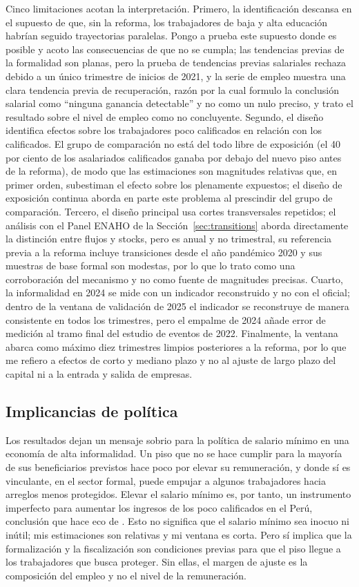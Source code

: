Cinco limitaciones acotan la interpretación. Primero, la identificación descansa en el supuesto de que, sin la reforma, los trabajadores de baja y alta educación habrían seguido trayectorias paralelas. Pongo a prueba este supuesto donde es posible y acoto las consecuencias de que no se cumpla; las tendencias previas de la formalidad son planas, pero la prueba de tendencias previas salariales rechaza debido a un único trimestre de inicios de 2021, y la serie de empleo muestra una clara tendencia previa de recuperación, razón por la cual formulo la conclusión salarial como ``ninguna ganancia detectable'' y no como un nulo preciso, y trato el resultado sobre el nivel de empleo como no concluyente. Segundo, el diseño identifica efectos sobre los trabajadores poco calificados en relación con los calificados. El grupo de comparación no está del todo libre de exposición (el 40 por ciento de los asalariados calificados ganaba por debajo del nuevo piso antes de la reforma), de modo que las estimaciones son magnitudes relativas que, en primer orden, subestiman el efecto sobre los plenamente expuestos; el diseño de exposición continua aborda en parte este problema al prescindir del grupo de comparación. Tercero, el diseño principal usa cortes transversales repetidos; el análisis con el Panel ENAHO de la Sección~\ref{sec:transitions} aborda directamente la distinción entre flujos y stocks, pero es anual y no trimestral, su referencia previa a la reforma incluye transiciones desde el año pandémico 2020 y sus muestras de base formal son modestas, por lo que lo trato como una corroboración del mecanismo y no como fuente de magnitudes precisas. Cuarto, la informalidad en 2024 se mide con un indicador reconstruido y no con el oficial; dentro de la ventana de validación de 2025 el indicador se reconstruye de manera consistente en todos los trimestres, pero el empalme de 2024 añade error de medición al tramo final del estudio de eventos de 2022. Finalmente, la ventana abarca como máximo diez trimestres limpios posteriores a la reforma, por lo que me refiero a efectos de corto y mediano plazo y no al ajuste de largo plazo del capital ni a la entrada y salida de empresas.

\subsection{Implicancias de política}

Los resultados dejan un mensaje sobrio para la política de salario mínimo en una economía de alta informalidad. Un piso que no se hace cumplir para la mayoría de sus beneficiarios previstos hace poco por elevar su remuneración, y donde sí es vinculante, en el sector formal, puede empujar a algunos trabajadores hacia arreglos menos protegidos. Elevar el salario mínimo es, por tanto, un instrumento imperfecto para aumentar los ingresos de los poco calificados en el Perú, conclusión que hace eco de \citet{jaramillo_lopez_2006}. Esto no significa que el salario mínimo sea inocuo ni inútil; mis estimaciones son relativas y mi ventana es corta. Pero sí implica que la formalización y la fiscalización son condiciones previas para que el piso llegue a los trabajadores que busca proteger. Sin ellas, el margen de ajuste es la composición del empleo y no el nivel de la remuneración.

